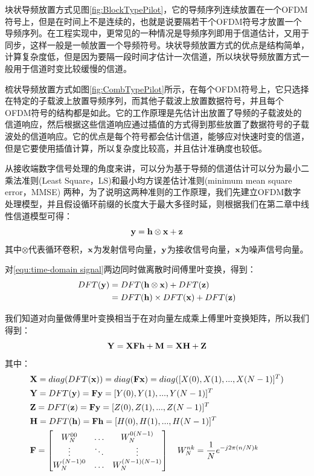 块状导频放置方式见图\ref{fig:BlockTypePilot}，它的导频序列连续放置在一个OFDM符号上，但是在时间上不是连续的，也就是说要隔若干个OFDM符号才放置一个导频序列。在工程实现中，更常见的一种情况是导频序列即用于信道估计，又用于同步，这样一般是一帧放置一个导频符号。块状导频放置方式的优点是结构简单，计算复杂度低，但是因为要隔一段时间才估计一次信道，所以块状导频放置方式一般用于信道时变比较缓慢的信道。

梳状导频放置方式如图\ref{fig:CombTypePilot}所示，在每个OFDM符号上，它只选择在特定的子载波上放置导频序列，而其他子载波上放置数据符号，并且每个OFDM符号的结构都是如此。它的工作原理是先估计出放置了导频的子载波处的信道响应，然后根据这些信道响应通过插值的方式得到那些放置了数据符号的子载波处的信道响应。它的优点是每个符号都会估计信道，能够应对快速时变的信道，但是它要使用插值计算，所以复杂度比较高，并且估计准确度也较低。

从接收端数字信号处理的角度来讲，可以分为基于导频的信道估计可以分为最小二乘法准则(Least Square，LS)和最小均方误差估计准则(minimum mean square error，MMSE)
两种，为了说明这两种准则的工作原理，我们先建立OFDM数字处理模型，并且假设循环前缀的长度大于最大多径时延，则根据我们在第二章中线性信道模型可得：
\begin{equation}
\bf y=h\otimes x+z
\label{equ:time-domain signal}
\end{equation}
其中$\otimes$代表循环卷积，$\textbf x$为发射信号向量，$\textbf y$为接收信号向量，$\textbf x$为噪声信号向量。

对\autoref{equ:time-domain signal}两边同时做离散时间傅里叶变换，得到：
\begin{equation}
\begin{aligned}
 DFT(\textbf y)&= DFT( \textbf h\otimes \textbf x)+DFT(\textbf z)\\
 &=DFT(\textbf h)\times DFT(\textbf x)+DFT(\textbf z)
\end{aligned}
\end{equation}

我们知道对向量做傅里叶变换相当于在对向量左成乘上傅里叶变换矩阵，所以我们得到：
\begin{equation}
\bf Y= XFh+M=XH+Z
\end{equation}
其中：
\begin{equation}
\begin{aligned}
&\textbf X=diag(DFT(\textbf x))=diag(\textbf F\textbf x )=diag([ X(0), X(1),..., X(N-1)]^T)\\
&\textbf Y=DFT(\textbf y)= \textbf F\textbf y =[ Y(0), Y(1),..., Y(N-1)]^{T} \\
&\textbf Z=DFT(\textbf z)= \textbf F\textbf y =[ Z(0), Z(1),..., Z(N-1)]^{T} \\
&\textbf H=DFT(\textbf h)= \textbf F\textbf h =[ H(0), H(1),..., H(N-1)]^{T} \\
&\textbf F=\begin{bmatrix}
W_N^{00} &\dots  &W_N^{0(N-1)} \\
\vdots &\ddots   &\vdots  \\
W_N^{(N-1)0} &\dots  &W_N^{(N-1)(N-1)}\\
\end{bmatrix}\quad
W_N^{nk}=\frac{1}{N}e^{-j2\pi(n/N)k}\\
\end{aligned}
\end{equation}

